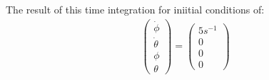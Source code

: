 The result of this time integration for iniitial conditions of:
\begin{equation}
    \begin{split}
        \begin{pmatrix}
            \dot \phi\\
            \dot \theta\\
            \phi\\
            \theta
        \end{pmatrix} = \begin{pmatrix}
            5 s^{-1}\\
            0\\
            0\\
            0
        \end{pmatrix}
    \end{split}
\end{equation}

